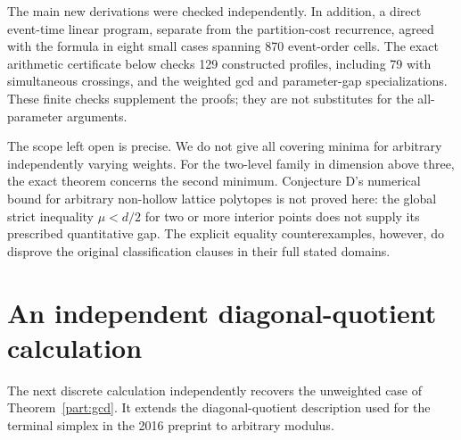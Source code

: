 \documentclass[11pt,a4paper]{article}
\theoremstyle{remark}\newtheorem{remark}[theorem]{Remark}
\begin{document}
The main new derivations were checked independently. In addition,
a direct event-time linear program, separate from the partition-cost
recurrence, agreed with the formula in eight small cases spanning
870 event-order cells. The exact arithmetic certificate below checks
129 constructed profiles, including 79 with simultaneous crossings,
and the weighted gcd and parameter-gap specializations. These finite
checks supplement the proofs; they are not substitutes for the
all-parameter arguments.

The scope left open is precise. We do not give all covering minima
for arbitrary independently varying weights. For the two-level
family in dimension above three, the exact theorem concerns the
second minimum. Conjecture D's numerical bound for arbitrary
non-hollow lattice polytopes is not proved here: the global strict
inequality $\mu<d/2$ for two or more interior points does not supply
its prescribed quantitative gap. The explicit equality
counterexamples, however, do disprove the original classification
clauses in their full stated domains.

\appendix


\section{An independent diagonal-quotient calculation}
\label{d:graph-appendix}

The next discrete calculation independently recovers the unweighted
case of Theorem~\ref{part:gcd}. It extends the diagonal-quotient
description used for the terminal simplex in the 2016 preprint
\cite[Proposition~4.8 and its proof]{GMS} to arbitrary modulus.
\end{document}

